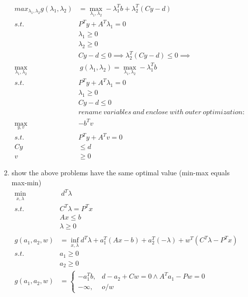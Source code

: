 \documentclass[12pt,letter]{article}
\begin{document}
\begin{enumerate}
\begin{enumerate}
\begin{align*}
      max_{\lambda_1,\lambda_2} g(\lambda_1,\lambda_2) & = \max_{\lambda_1,\lambda_2} -\lambda_1^Tb + \lambda_2^T(Cy-d)\\
      s.t.\ & P^Ty + A^T\lambda_1 = 0\\
      &\lambda_1 \geq 0\\
      &\lambda_2 \geq 0\\
      &Cy-d \leq 0 \implies \lambda_2^T(Cy-d)  \leq 0 \implies\\
      \max_{\lambda_1,\lambda_2} & \ g(\lambda_1,\lambda_2) = \max_{\lambda_1,\lambda_2} -\lambda_1^Tb\\
      s.t.\ & P^Ty + A^T\lambda_1 = 0\\
      &\lambda_1 \geq 0\\
             &Cy-d \leq 0\\
             &rename\ variables\ and\ enclose\ with\ outer\ optimization:\\
      \max_{y,v} &-b^Tv\\
      s.t.\ &P^T y + A^Tv = 0\\
      Cy &\leq d\\
      v &\geq 0
    \end{align*}
  \item show the above problems have the same optimal value (min-max equals max-min)
    \begin{align*}
      \min_{x,\lambda}&\ d^T \lambda\\
      s.t.\ & C^T\lambda = P^T x\\
                       &Ax \leq b\\
                       &\lambda \geq 0\\
      \\
      g(a_1,a_2,w) &= \inf_{x,\lambda} d^T\lambda + a_1^T(Ax-b)+a_2^T(-\lambda) + w^T(C^T\lambda-P^Tx)\\
      s.t.\ &a_1 \geq 0\\
                       &a_2 \geq 0\\
      g(a_1,a_2,w) &=
                     \begin{cases}
                       -a_1^Tb , & d-a_2+Cw=0 \wedge A^Ta_1-Pw=0\\
                       -\infty, & o/w
                     \end{cases}\\

\end{align*}
\end{enumerate}
\end{enumerate}
\end{document}
